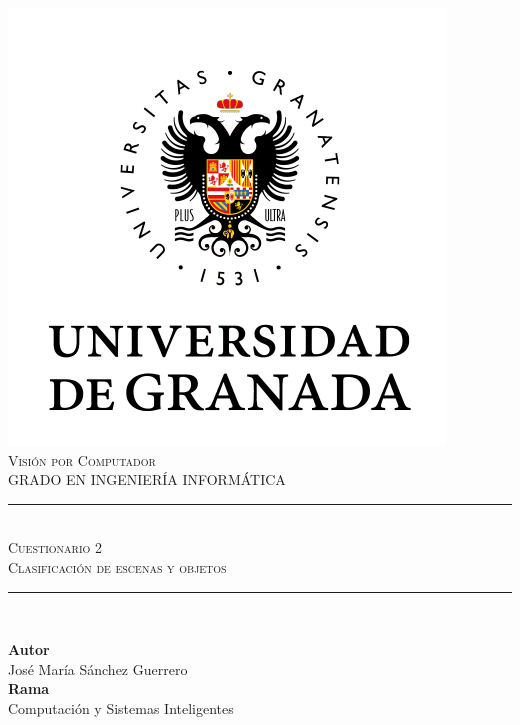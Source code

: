 \documentclass[11pt,a4paper]{article}
\newcommand{\asignatura}{Visión por Computador}
\newcommand{\autor}{José María Sánchez Guerrero}
\newcommand{\titulo}{Cuestionario 2}
\newcommand{\subtitulo}{Clasificación de escenas y objetos}
\begin{document}

\begin{titlepage}

\begin{minipage}{\textwidth}

\centering

\includegraphics[scale=0.5]{img/ugr.png}\\

\textsc{\Large \asignatura{}\\[0.2cm]}
\textsc{GRADO EN INGENIERÍA INFORMÁTICA}\\[1cm]

\noindent\rule[-1ex]{\textwidth}{1pt}\\[1.5ex]
\textsc{{\Huge \titulo\\[0.5ex]}}
\textsc{{\Large \subtitulo\\}}
\noindent\rule[-1ex]{\textwidth}{2pt}\\[3.5ex]

\end{minipage}

\vspace{0.5cm}

\begin{minipage}{\textwidth}

\centering

\textbf{Autor}\\ {\autor{}}\\[2.5ex]
\textbf{Rama}\\ {Computación y Sistemas Inteligentes}\\[2.5ex]
\vspace{0.3cm}


\end{minipage}
\end{titlepage}
\end{document}
